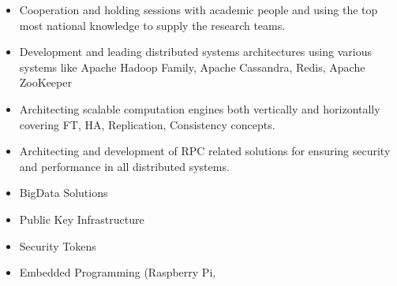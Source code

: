 \documentclass[10pt,a4paper]{article}
\begin{document}
\begin{itemize}
    \item \small Cooperation and holding sessions with academic people and using the top most national knowledge to supply the research teams.
    \item \small Development and leading distributed systems architectures using various systems like Apache Hadoop Family, Apache Cassandra, Redis, Apache ZooKeeper
    \item \small Architecting scalable computation engines both vertically and horizontally covering FT, HA, Replication, Consistency  concepts.
    \item \small Architecting and development of RPC related solutions for ensuring security and performance in all distributed systems.
     \item \small BigData Solutions
     \item \small Public Key Infrastructure
     \item \small Security Tokens
     \item \small Embedded Programming (Raspberry Pi, 
  \end{itemize}
  \setlength{\leftskip}{0pt}
  \setlength{\rightskip}{0cm}
	  
\end{document}
